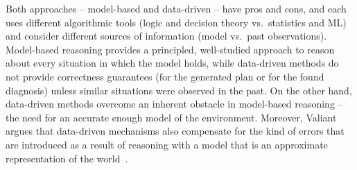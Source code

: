 \documentclass[12pt]{article}
\begin{document}
Both approaches -- model-based and data-driven --  have pros and cons, and each uses different algorithmic tools (logic and decision theory vs.~statistics and ML) and consider different sources of information (model vs.~past observations). 
Model-based reasoning provides a principled,  well-studied approach to reason about every situation in which the model holds, while data-driven methods do not provide correctness guarantees (for the generated plan or  for the found diagnosis) unless similar situations were observed in the past. 
On the other hand, data-driven methods overcome an inherent obstacle in model-based reasoning -- the need for an accurate enough model of the environment. Moreover, Valiant argues that  data-driven mechanisms also compensate for the kind of errors that are introduced as a result of  reasoning with a model that is an approximate representation of the world~\cite{valiant2000neuroidal,valiant2000robustLogics}. %

\end{document}

